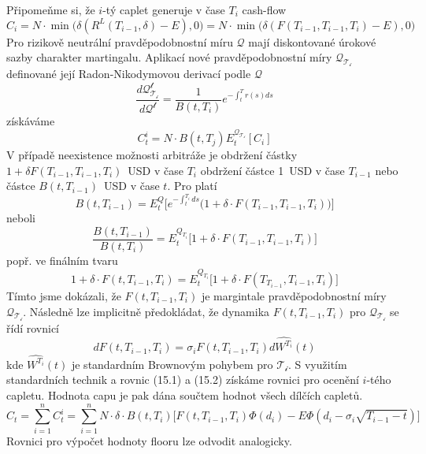 \documentclass[a4paper]{book}
\begin{document}
Připomeňme si, že $i$-tý caplet generuje v čase $T_i$ cash-flow
\begin{equation*}
C_i = N \cdot \min \big( \delta (R^L(T_{i-1}, \delta) - E), 0 \big) = N \cdot \min \big( \delta (F(T_{i-1}, T_{i-1}, T_i) - E), 0 \big)
\end{equation*}
Pro rizikově neutrální pravděpodobnostní míru $\mathcal{Q}$ mají diskontované úrokové sazby charakter martingalu. Aplikací nové pravděpodobnostní míry $\mathcal{Q_{T_i}}$ definované její Radon-Nikodymovou derivací podle $\mathcal{Q}$
\begin{equation*}
\frac{d \mathcal{Q_{T_i}^t}}{d \mathcal{Q^t}} = \frac{1}{B(t,T_i)} e^{-\int_t^T r(s)ds}
\end{equation*}
získáváme
\begin{equation}
C_t^i = N \cdot B(t, T_j) E_t^{\mathcal{Q_{T_i}}}[C_i]
\end{equation}
V případě neexistence možnosti arbitráže je obdržení částky $1 + \delta F(T_{i-1}, T_{i-1}, T_i)$~USD v čase $T_i$ obdržení částce 1~USD v čase $T_{i-1}$ nebo částce $B(t,T_{i-1})$~USD v čase $t$. Pro platí
\begin{equation*}
B(t, T_{i-1}) = E_t^Q \big[ e^{-\int_t^{T_i}ds} \big( 1 + \delta \cdot F(T_{i-1}, T_{i-1}, T_i) \big) \big]
\end{equation*}
neboli
\begin{equation*}
\frac{B(t, T_{i-1})}{B(t,T_i)} = E_t^{Q_{T_i}} \big[ 1 + \delta \cdot F(T_{i-1}, T_{i-1}, T_i) \big]
\end{equation*}
popř. ve finálním tvaru
\begin{equation*}
1 + \delta \cdot F(t, T_{i-1}, T_i) = E_t^{Q_{T_i}} \big[ 1 + \delta \cdot F(T_{T_{i-1}}, T_{i-1}, T_i)\big]
\end{equation*}
Tímto jsme dokázali, že $F(t, T_{i-1}, T_i)$ je margintale pravděpodobnostní míry $\mathcal{Q_{T_i}}$. Následně lze implicitně předokládat, že dynamika $F(t, T_{i-1}, T_i)$ pro $\mathcal{Q_{T_i}}$ se řídí rovnicí
\begin{equation}
d F(t, T_{i-1}, T_i) = \sigma_i F(t, T_{i-1}, T_i) d \hat{W^{T_i}}(t)
\end{equation}
kde $\hat{W^{T_i}}(t)$ je standardním Brownovým pohybem pro $\mathcal{T_i}$. S využitím standardních technik a rovnic (15.1) a (15.2) získáme rovnici pro ocenění $i$-tého capletu. Hodnota capu je pak dána součtem hodnot všech dílčích capletů.
\begin{equation*}
C_t = \sum_{i=1}^n C_t^i = \sum_{i = 1}^n N \cdot \delta \cdot B(t, T_i) \big[ F(t, T_{i-1}, T_i) \Phi(d_i) - E \Phi(d_i - \sigma_i \sqrt{T_{i-1}-t})\big]
\end{equation*}
Rovnici pro výpočet hodnoty flooru lze odvodit analogicky.
\end{document}

